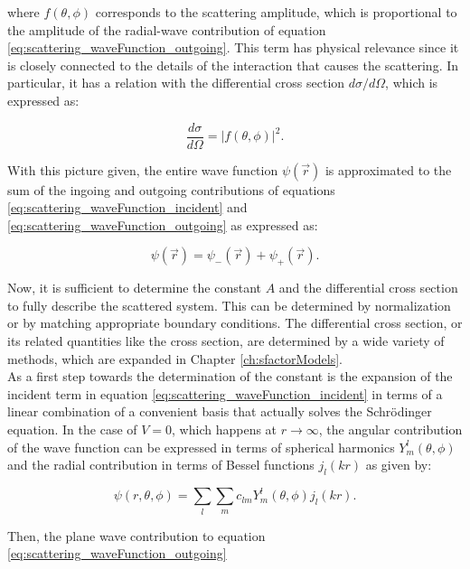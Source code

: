 \documentclass[openany]{book}
\begin{document}
where $f(\theta, \phi)$ corresponds to the scattering amplitude, which is proportional to the amplitude of the radial-wave contribution of equation \ref{eq:scattering_waveFunction_outgoing}. This term has physical relevance since it is closely connected to the details of the interaction that causes the scattering. In particular, it has a relation with the differential cross section $d\sigma / d\Omega$, which is expressed as: 

\begin{equation}  \label{eq:scattering_diffCrossSection}
	\frac{d\sigma}{d\Omega} = |f(\theta, \phi)|^2.
\end{equation}

With this picture given, the entire wave function $\psi(\vec r)$ is approximated to the sum of the ingoing and outgoing contributions of equations \ref{eq:scattering_waveFunction_incident} and  \ref{eq:scattering_waveFunction_outgoing} as expressed as: 

\begin{equation} \label{eq:scattering_waveFunction_ansatz}
	\psi(\vec r) = 	\psi_{-}(\vec r) + \psi_{+}(\vec r).
\end{equation}

Now, it is sufficient to determine the constant $A$ and the differential cross section to fully describe the scattered system. This can be determined by normalization or by matching appropriate boundary conditions. The differential cross section, or its related quantities like the cross section, are determined by a wide variety of methods, which are expanded in Chapter \ref{ch:sfactorModels}.  \\

As a first step towards the determination of the constant is the expansion of the incident term in equation \ref{eq:scattering_waveFunction_incident} in terms of a linear combination of a convenient basis that actually solves the Schrödinger equation. In the case of $V = 0$, which happens at $r \rightarrow \infty$, the angular contribution of the wave function can be expressed in terms of spherical harmonics $Y_{m}^{l}(\theta, \phi)$ and the radial contribution in terms of Bessel functions $j_l(kr)$ as given by:

\begin{equation}   \label{eq:partialWaveExpansion_definition}
	\psi(r, \theta, \phi) =  \sum_{l} \sum_{m} {c_{lm}Y_{m}^{l}(\theta, \phi)j_l(kr)}.
\end{equation}

Then, the plane wave contribution to equation \ref{eq:scattering_waveFunction_outgoing}
\end{document}
